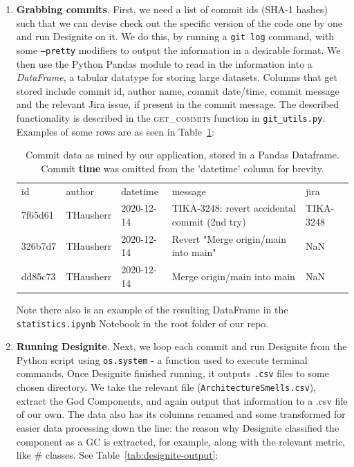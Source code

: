 \documentclass{article}
\begin{document}
\begin{enumerate}
    \item \textbf{Grabbing commits}. First, we need a list of commit ids (SHA-1 hashes) such that we can devise check out the specific version of the code one by one and run Designite on it. We do this, by running a \texttt{git log} command, with some \texttt{--pretty} modifiers to output the information in a desirable format. We then use the Python Pandas \citep{mckinney2011pandas} module to read in the information into a \textit{DataFrame}, a tabular datatype for storing large datasets. Columns that get stored include commit id, author name, commit date/time, commit message and the relevant Jira issue, if present in the commit message. The described functionality is described in the \textsc{get\_commits} function in \texttt{git\_utils.py}. Examples of some rows are as seen in Table~\ref{tab:commits-example}:
    
    \begin{table}[ht]
    \begin{tabular}{lllll}
    id                                       & author    & datetime                  & message                                       & jira      \\
    7f65d61 & THausherr & 2020-12-14 & TIKA-3248: revert accidental commit (2nd try) & TIKA-3248 \\
    326b7d7 & THausherr & 2020-12-14 & Revert "Merge origin/main into main"          & NaN       \\
    dd85c73 & THausherr & 2020-12-14 & Merge origin/main into main                   & NaN      
    \end{tabular}
    \caption{Commit data as mined by our application, stored in a Pandas Dataframe. Commit \textbf{time} was omitted from the 'datetime' column for brevity.}
    \label{tab:commits-example}
    \end{table}
    
    Note there also is an example of the resulting DataFrame in the \texttt{statistics.ipynb} Notebook in the root folder of our repo.
    
    \item \textbf{Running Designite}. Next, we loop each commit and run Designite from the Python script using \texttt{os.system} - a function used to execute terminal commands. Once Designite finished running, it outputs \texttt{.csv} files to some chosen directory. We take the relevant file (\texttt{ArchitectureSmells.csv}), extract the God Components, and again output that information to a .csv file of our own. The data also has its columns renamed and some transformed for easier data processing down the line: the reason why Designite classified the component as a GC is extracted, for example, along with the relevant metric, like \# classes. See Table~\ref{tab:designite-output}:
    

\end{enumerate}
\end{document}
